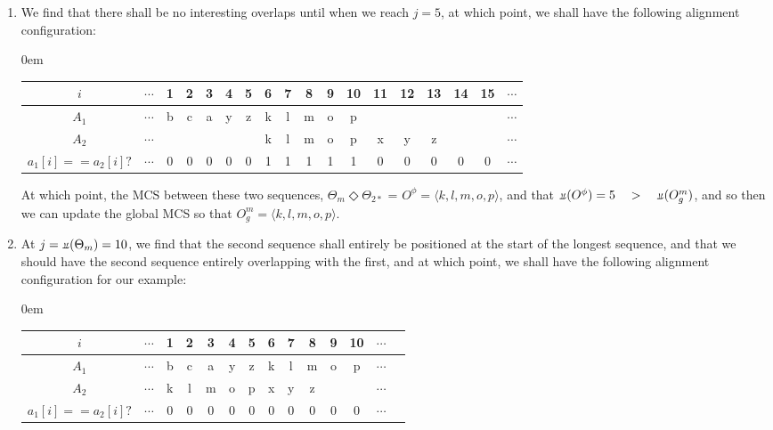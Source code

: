 \documentclass[a4paper, 18pt]{article} %
\newcommand{\invpi}{\rotatebox[origin=c]{180}{$\pi$}}
\begin{document}
\begin{enumerate}
{At which point, the MCS between these two sequences, $\Theta_m \Diamond \Theta_{2*}$ = $O^\phi = \langle \rangle$.

}
\item{ We find that there shall be no interesting overlaps until when we reach $j = 5$, at which point, we shall have the following alignment configuration:

\vspace{1em}
\begin{adjustwidth}{0em}{}
\begin{tabular}[H]{|c||c|c|c|c|c|c|c|c|c|c|c|c|c|c|c|c|c|}
\hline
$i$ & $\cdots$ & 1 & 2 & 3 & 4 & 5 & 6 & 7 & 8 & 9 & 10 & 11 & 12 & 13 & 14 & 15 & $\cdots$ \\
\hline
$A_1$ & $\cdots$ & b & c & a & y & z & k & l & m & o & p &  &  &  &  &  &$\cdots$ \\
\hline
$A_2$ & $\cdots$ &  &  &  &  &  & k & l & m & o & p & x & y & z &  &  &$\cdots$\\
\hline
$a_1[i]==a_2[i]?$ & $\cdots$ & 0 & 0 & 0 & 0 & 0 & 1 & 1 & 1 & 1 & 1 & 0 & 0 & 0 & 0 & 0 & $\cdots$ \\
\hline
 
\end{tabular}
\end{adjustwidth}
\vspace{1em}

At which point, the MCS between these two sequences, $\Theta_m \Diamond \Theta_{2*}$ = $O^\phi = \langle k, l, m, o, p\rangle$, and that $\invpi(O^\phi) = 5 \quad > \quad \invpi(O^m_g)$, and so then we can update the global MCS so that $O^m_g = \langle k, l, m, o, p\rangle$.


}
\item{ At $j =  \invpi(\Theta_m) = 10$, we find that the second sequence shall entirely be positioned at the start of the longest sequence, and that we should have the second sequence entirely overlapping with the first, and at which point, we shall have the following alignment configuration for our example:

\vspace{1em}
\begin{adjustwidth}{0em}{}
\begin{tabular}[H]{|c||c|c|c|c|c|c|c|c|c|c|c|c|c|}
\hline
$i$ & $\cdots$ & 1 & 2 & 3 & 4 & 5 & 6 & 7 & 8 & 9 & 10 & $\cdots$ \\
\hline
$A_1$ & $\cdots$ & b & c & a & y & z & k & l & m & o & p &$\cdots$ \\
\hline
$A_2$ & $\cdots$ & k & l & m & o & p & x & y & z &  &  &$\cdots$\\
\hline
$a_1[i]==a_2[i]?$ & $\cdots$ & 0 & 0 & 0 & 0 & 0 & 0 & 0 & 0 & 0 & 0  & $\cdots$ \\
\hline
 

\end{tabular}
\end{adjustwidth}}
\end{enumerate}
\end{document}
